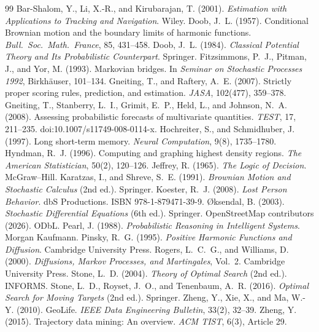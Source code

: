 \documentclass[11pt]{article}
\begin{document}

\begin{thebibliography}{99}
 Bar-Shalom, Y., Li, X.-R., and Kirubarajan, T.
(2001). \emph{Estimation with Applications to Tracking and Navigation}. Wiley.
 Doob, J.~L. (1957). Conditional Brownian motion and the
boundary limits of harmonic functions. \emph{Bull.\ Soc.\ Math.\ France}, 85, 431--458.
 Doob, J.~L. (1984). \emph{Classical Potential Theory and Its
Probabilistic Counterpart}. Springer.
 Fitzsimmons, P.~J., Pitman, J., and Yor, M.
(1993). Markovian bridges. In \emph{Seminar on Stochastic Processes 1992}, Birkh\"auser, 101--134.
 Gneiting, T., and Raftery, A.~E. (2007).
Strictly proper scoring rules, prediction, and estimation. \emph{JASA}, 102(477), 359--378.
 Gneiting, T., Stanberry, L.~I.,
Grimit, E.~P., Held, L., and Johnson, N.~A. (2008). Assessing probabilistic
forecasts of multivariate quantities. \emph{TEST}, 17, 211--235.
doi:10.1007/s11749-008-0114-x.
 Hochreiter, S., and Schmidhuber, J.
(1997). Long short-term memory. \emph{Neural Computation}, 9(8), 1735--1780.
 Hyndman, R.~J. (1996). Computing and graphing highest
density regions. \emph{The American Statistician}, 50(2), 120--126.
 Jeffrey, R. (1965). \emph{The Logic of Decision}. McGraw--Hill.
 Karatzas, I., and Shreve, S.~E. (1991).
\emph{Brownian Motion and Stochastic Calculus} (2nd ed.). Springer.
 Koester, R.~J. (2008). \emph{Lost Person Behavior}.
dbS Productions. ISBN 978-1-879471-39-9.
 \O{}ksendal, B. (2003). \emph{Stochastic
Differential Equations} (6th ed.). Springer.
 OpenStreetMap contributors (2026). ODbL.
 Pearl, J. (1988). \emph{Probabilistic Reasoning in
Intelligent Systems}. Morgan Kaufmann.
 Pinsky, R.~G. (1995). \emph{Positive Harmonic Functions
and Diffusion}. Cambridge University Press.
 Rogers, L.~C.~G., and Williams, D. (2000).
\emph{Diffusions, Markov Processes, and Martingales}, Vol.~2. Cambridge University Press.
 Stone, L.~D. (2004). \emph{Theory of Optimal Search} (2nd ed.).
INFORMS.
 Stone, L.~D., Royset, J.~O., and Tenenbaum, A.~R.
(2016). \emph{Optimal Search for Moving Targets} (2nd ed.). Springer.
 Zheng, Y., Xie, X., and Ma, W.-Y. (2010).
GeoLife. \emph{IEEE Data Engineering Bulletin}, 33(2), 32--39.
 Zheng, Y. (2015). Trajectory data mining: An
overview. \emph{ACM TIST}, 6(3), Article 29.
\end{thebibliography}
\end{document}
